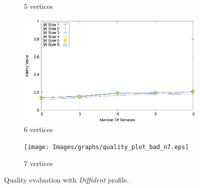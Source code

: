 \begin{figure}[ht]
\begin{subfigure}{0.33\textwidth}
    \caption{5 vertices}
    \label{fig:quality_window_bad_c}
  \end{subfigure}
  \hfill
  \begin{subfigure}{0.33\textwidth}
    \includegraphics[width=\textwidth]{Images/graphs/quality_plot_bad_percentage_n6.eps}
    \caption{6 vertices}
    \label{fig:quality_window_bad_d}
  \end{subfigure}
  \hspace{0.04\textwidth}
  \begin{subfigure}{0.33\textwidth}
    \texttt{[image: Images/graphs/quality\_plot\_bad\_n7.eps]}
    \caption{7 vertices}
    \label{fig:quality_window_bad_e}
  \end{subfigure}
  \hfill
  \caption{Quality evaluation with \textit{Diffident} profile.}
  \label{fig:quality_window_bad}
\end{figure}
